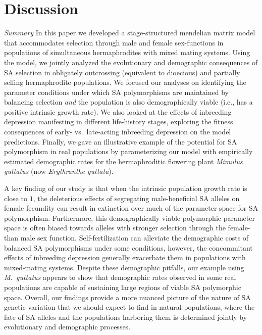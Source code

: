 \documentclass[11pt]{article}
\begin{document}
\section{Discussion}
\textit{Summary} \newline
In this paper we developed a stage-structured mendelian matrix model that accommodates selection through male and female sex-functions in populations of simultaneous hermaphrodites with mixed mating systems. Using the model, we jointly analyzed the evolutionary and demographic consequences of SA selection in obligately outcrossing (equivalent to dioecious) and partially selfing hermaphrodite populations. We focused our analyses on identifying the parameter conditions under which SA polymorphisms are maintained by balancing selection {\itshape and} the population is also demographically viable (i.e., has a positive intrinsic growth rate). We also looked at the effects of inbreeding depression manifesting in different life-history stages, exploring the fitness consequences of early- vs.~late-acting inbreeding depression on the model predictions. Finally, we gave an illustrative example of the potential for SA polymorphism in real populations by parameterizing our model with empirically estimated demographic rates for the hermaphroditic flowering plant {\itshape Mimulus guttatus} (now {\itshape Erythranthe guttata}).

A key finding of our study is that when the intrinsic population growth rate is close to $1$, the deleterious effects of segregating male-beneficial SA alleles on female fecundity can result in extinction over much of the parameter space for SA polymorphism. Furthermore, this demographically viable polymorphic parameter space is often biased towards alleles with stronger selection through the female- than male sex function. Self-fertilization can alleviate the demographic costs of balanced SA polymorphisms under some conditions, however, the concommitant effects of inbreeding depression generally exacerbate them in populations with mixed-mating systems. Despite these demographic pitfalls, our example using {\itshape M.~guttatus} appears to show that demographic rates observed in some real populations are capable of sustaining large regions of viable SA polymorphic space. Overall, our findings provide a more nuanced picture of the nature of SA genetic variation that we should expect to find in natural populations, where the fate of SA alleles and the populations harboring them is determined jointly by evolutionary and demographic processes.
\end{document}

